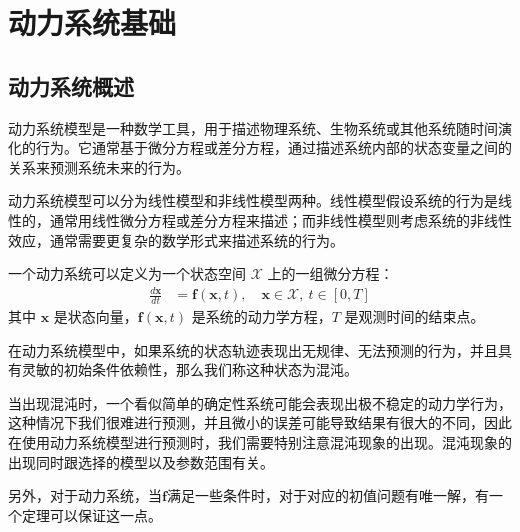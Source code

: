 \chapter{动力系统基础}\label{chap:dynamic}


\section{动力系统概述}
动力系统模型是一种数学工具，用于描述物理系统、生物系统或其他系统随时间演化的行为。它通常基于微分方程或差分方程，通过描述系统内部的状态变量之间的关系来预测系统未来的行为。

动力系统模型可以分为线性模型和非线性模型两种。线性模型假设系统的行为是线性的，通常用线性微分方程或差分方程来描述；而非线性模型则考虑系统的非线性效应，通常需要更复杂的数学形式来描述系统的行为。

\begin{defn}[动力系统]
    一个动力系统可以定义为一个状态空间 $\mathcal{X}$ 上的一组微分方程：
    \begin{equation}\label{eq:dynamic_system}
        \begin{aligned}
            \frac{d\mathbf{x}}{dt} & = \mathbf{f}(\mathbf{x}, t), \quad \mathbf{x} \in \mathcal{X}, \ t \in [0, T]
        \end{aligned}
    \end{equation}
    其中 $\mathbf{x}$ 是状态向量，$\mathbf{f}(\mathbf{x}, t)$ 是系统的动力学方程，$T$ 是观测时间的结束点。
\end{defn}

\begin{defn}[混沌]
    在动力系统模型中，如果系统的状态轨迹表现出无规律、无法预测的行为，并且具有灵敏的初始条件依赖性，那么我们称这种状态为混沌。
\end{defn}

当出现混沌时，一个看似简单的确定性系统可能会表现出极不稳定的动力学行为，这种情况下我们很难进行预测，并且微小的误差可能导致结果有很大的不同，因此在使用动力系统模型进行预测时，我们需要特别注意混沌现象的出现。混沌现象的出现同时跟选择的模型以及参数范围有关。

另外，对于动力系统，当$\mathbf{f}$满足一些条件时，对于对应的初值问题有唯一解，有一个定理可以保证这一点。

